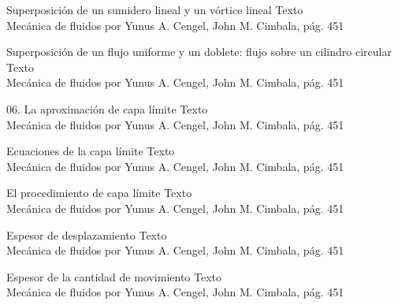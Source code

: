 
\begin{frame}{Superposición de un sumidero lineal y un vórtice lineal}
\justifying
Texto
\\
{\tiny Mecánica de fluidos por Yunus A. Cengel, John M. Cimbala, pág. 451}
\end{frame}


\begin{frame}{Superposición de un flujo uniforme y un doblete: flujo sobre un cilindro circular}
\justifying
Texto
\\
{\tiny Mecánica de fluidos por Yunus A. Cengel, John M. Cimbala, pág. 451}
\end{frame}


\begin{frame}{06. La aproximación de capa límite}
\justifying
Texto
\\
{\tiny Mecánica de fluidos por Yunus A. Cengel, John M. Cimbala, pág. 451}
\end{frame}


\begin{frame}{Ecuaciones de la capa límite}
\justifying
Texto
\\
{\tiny Mecánica de fluidos por Yunus A. Cengel, John M. Cimbala, pág. 451}
\end{frame}


\begin{frame}{El procedimiento de capa límite}
\justifying
Texto
\\
{\tiny Mecánica de fluidos por Yunus A. Cengel, John M. Cimbala, pág. 451}
\end{frame}


\begin{frame}{Espesor de desplazamiento}
\justifying
Texto
\\
{\tiny Mecánica de fluidos por Yunus A. Cengel, John M. Cimbala, pág. 451}
\end{frame}


\begin{frame}{Espesor de la cantidad de movimiento}
\justifying
Texto
\\
{\tiny Mecánica de fluidos por Yunus A. Cengel, John M. Cimbala, pág. 451}
\end{frame}

